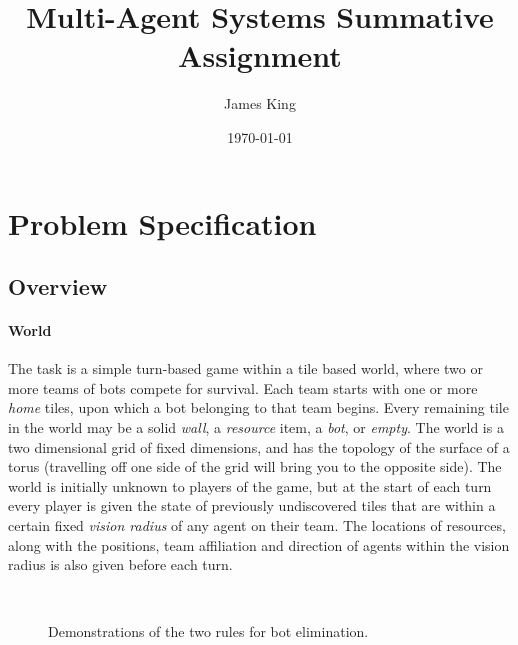 \documentclass[a4paper,10pt]{article}
\title{Multi-Agent Systems Summative Assignment}
\date{\today}
\author{James King}
\begin{document}
\maketitle

\section{Problem Specification}
\subsection{Overview}
\paragraph{World}
The task is a simple turn-based game within a tile based world, where two or more teams of bots compete for survival. Each team starts with one or more \emph{home} tiles, upon which a bot belonging to that team begins. Every remaining tile in the world may be a solid \emph{wall}, a \emph{resource} item, a \emph{bot}, or \emph{empty}. The world is a two dimensional grid of fixed dimensions, and has the topology of the surface of a torus (travelling off one side of the grid will bring you to the opposite side). The world is initially unknown to players of the game, but at the start of each turn every player is given the state of previously undiscovered tiles that are within a certain fixed \emph{vision radius} of any agent on their team. The locations of resources, along with the positions, team affiliation and direction of agents within the vision radius is also given before each turn.

\begin{figure}[ht]
  \centering
  \mbox{
    \quad
  }
  \caption{Demonstrations of the two rules for bot elimination.}
  \vspace{-5mm}
\end{figure}
\end{document}
